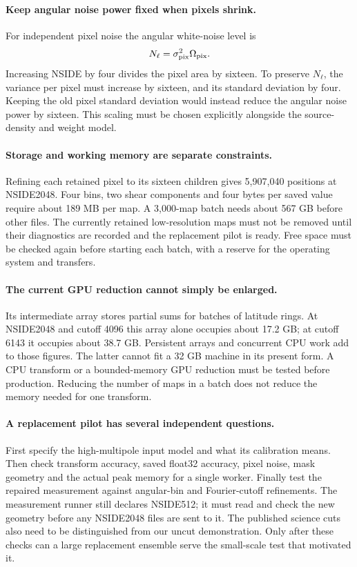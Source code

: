 \documentclass[11pt]{article}
\begin{document}
\paragraph{Keep angular noise power fixed when pixels shrink.}
For independent pixel noise the angular white-noise level is
\begin{equation}
 N_\ell=\sigma_{\rm pix}^2\Omega_{\rm pix}.
\end{equation}
Increasing NSIDE by four divides the pixel area by sixteen. To preserve
$N_\ell$, the variance per pixel must increase by sixteen, and its standard
deviation by four. Keeping the old pixel standard deviation would instead
reduce the angular noise power by sixteen. This scaling must be chosen
explicitly alongside the source-density and weight model.

\paragraph{Storage and working memory are separate constraints.}
Refining each retained pixel to its sixteen children gives 5,907,040
positions at NSIDE2048. Four bins, two shear components and four bytes
per saved value require about 189 MB per map. A 3,000-map batch needs
about 567 GB before other files. The currently retained low-resolution
maps must not be removed until their diagnostics are recorded and the
replacement pilot is ready. Free space must be checked again before
starting each batch, with a reserve for the operating system and transfers.

\paragraph{The current GPU reduction cannot simply be enlarged.}
Its intermediate array stores partial sums for batches of latitude rings.
At NSIDE2048 and cutoff 4096 this array alone occupies about 17.2 GB;
at cutoff 6143 it occupies about 38.7 GB. Persistent arrays and concurrent
CPU work add to those figures. The latter cannot fit a 32 GB machine in
its present form. A CPU transform or a bounded-memory GPU reduction must
be tested before production. Reducing the number of maps in a batch does
not reduce the memory needed for one transform.

\paragraph{A replacement pilot has several independent questions.}
First specify the high-multipole input model and what its calibration
means. Then check transform accuracy, saved float32 accuracy, pixel noise,
mask geometry and the actual peak memory for a single worker. Finally test
the repaired measurement against angular-bin and Fourier-cutoff refinements.
The measurement runner still declares NSIDE512; it must read and check the
new geometry before any NSIDE2048 files are sent to it. The published
science cuts also need to be distinguished from our uncut demonstration.
Only after these checks can a large replacement ensemble serve the
small-scale test that motivated it.
\end{document}
